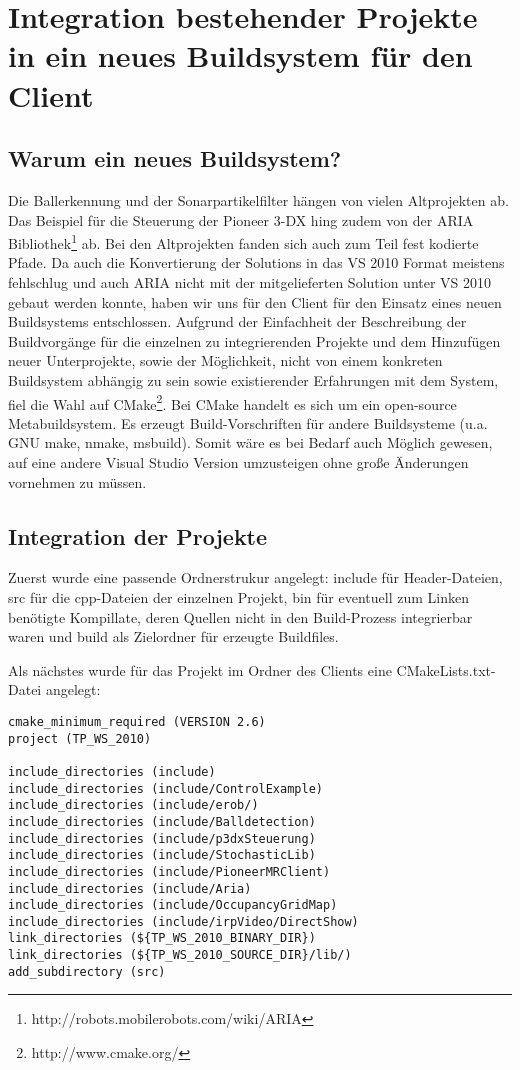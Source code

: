 \section{Integration bestehender Projekte in ein neues Buildsystem für den
Client}
\label{cha:integr-best-proj}
\subsection{Warum ein neues Buildsystem?}
Die Ballerkennung und der Sonarpartikelfilter hängen von vielen
Altprojekten
ab. Das Beispiel für die Steuerung der Pioneer 3-DX hing zudem von der ARIA
Bibliothek\footnote{http://robots.mobilerobots.com/wiki/ARIA} ab. Bei den
Altprojekten fanden sich auch zum Teil fest kodierte Pfade. Da auch die
Konvertierung der Solutions in das VS 2010 Format meistens fehlschlug und
auch
ARIA nicht mit der mitgelieferten Solution unter VS 2010 gebaut werden
konnte,
haben wir uns für den Client für den Einsatz eines neuen Buildsystems
entschlossen. Aufgrund der Einfachheit der Beschreibung der Buildvorgänge
für
die einzelnen zu integrierenden Projekte und dem Hinzufügen neuer
Unterprojekte, sowie der Möglichkeit, nicht von einem konkreten Buildsystem
abhängig
zu sein sowie existierender Erfahrungen mit dem System, fiel die Wahl auf
CMake\footnote{http://www.cmake.org/}. Bei CMake handelt es sich um ein
open-source Metabuildsystem. Es erzeugt Build-Vorschriften für andere
Buildsysteme (u.a. GNU make, nmake, msbuild). Somit wäre es bei Bedarf auch
Möglich gewesen, auf eine andere Visual Studio Version umzusteigen ohne große
Änderungen vornehmen zu müssen.

\subsection{Integration der Projekte}
Zuerst wurde eine passende Ordnerstrukur angelegt: include für
Header-Dateien,
src für die cpp-Dateien der einzelnen Projekt, bin für eventuell zum Linken
 benötigte
Kompillate, deren Quellen nicht in den Build-Prozess integrierbar waren und
build als Zielordner für erzeugte Buildfiles.

Als nächstes wurde für das Projekt im Ordner des Clients eine
CMakeLists.txt-Datei angelegt:

\begin{lstlisting}[captionpos=b,caption={CMakeLists.txt für das Buildsystem des Clients}]
cmake_minimum_required (VERSION 2.6)
project (TP_WS_2010)

include_directories (include)
include_directories (include/ControlExample)
include_directories (include/erob/)
include_directories (include/Balldetection)
include_directories (include/p3dxSteuerung)
include_directories (include/StochasticLib)
include_directories (include/PioneerMRClient)
include_directories (include/Aria)
include_directories (include/OccupancyGridMap)
include_directories (include/irpVideo/DirectShow)
link_directories (${TP_WS_2010_BINARY_DIR})
link_directories (${TP_WS_2010_SOURCE_DIR}/lib/)
add_subdirectory (src)
\end{lstlisting}

